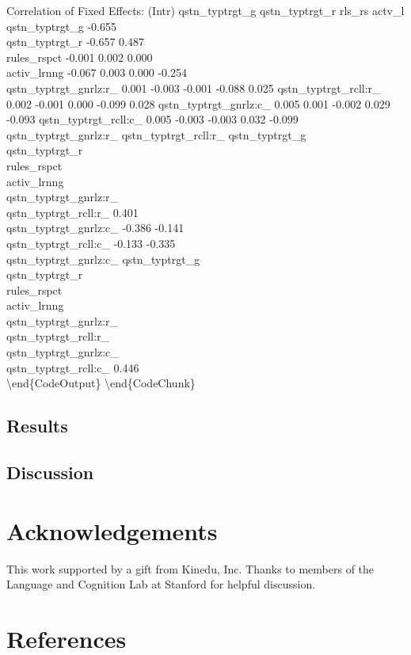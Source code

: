 \documentclass[10pt, letterpaper]{article}
\begin{document}
Correlation of Fixed Effects: (Intr) qstn\_typtrgt\_g qstn\_typtrgt\_r
rls\_rs actv\_l qstn\_typtrgt\_g -0.655\\qstn\_typtrgt\_r -0.657
0.487\\rules\_rspct -0.001 0.002 0.000\\activ\_lrnng -0.067 0.003 0.000
-0.254\\qstn\_typtrgt\_gnrlz:r\_ 0.001 -0.003 -0.001 -0.088 0.025
qstn\_typtrgt\_rcll:r\_ 0.002 -0.001 0.000 -0.099 0.028
qstn\_typtrgt\_gnrlz:c\_ 0.005 0.001 -0.002 0.029 -0.093
qstn\_typtrgt\_rcll:c\_ 0.005 -0.003 -0.003 0.032 -0.099
qstn\_typtrgt\_gnrlz:r\_ qstn\_typtrgt\_rcll:r\_
qstn\_typtrgt\_g\\qstn\_typtrgt\_r\\rules\_rspct\\activ\_lrnng\\qstn\_typtrgt\_gnrlz:r\_\\qstn\_typtrgt\_rcll:r\_
0.401\\qstn\_typtrgt\_gnrlz:c\_ -0.386 -0.141\\qstn\_typtrgt\_rcll:c\_
-0.133 -0.335\\ qstn\_typtrgt\_gnrlz:c\_
qstn\_typtrgt\_g\\qstn\_typtrgt\_r\\rules\_rspct\\activ\_lrnng\\qstn\_typtrgt\_gnrlz:r\_\\qstn\_typtrgt\_rcll:r\_\\qstn\_typtrgt\_gnrlz:c\_\\qstn\_typtrgt\_rcll:c\_
0.446\\\textbackslash{}end\{CodeOutput\}
\textbackslash{}end\{CodeChunk\}

\subsection{Results}\label{results}

\subsection{Discussion}\label{discussion}

\section{Acknowledgements}\label{acknowledgements}

This work supported by a gift from Kinedu, Inc. Thanks to members of the
Language and Cognition Lab at Stanford for helpful discussion.

\section{References}\label{references}

\small
\end{document}
